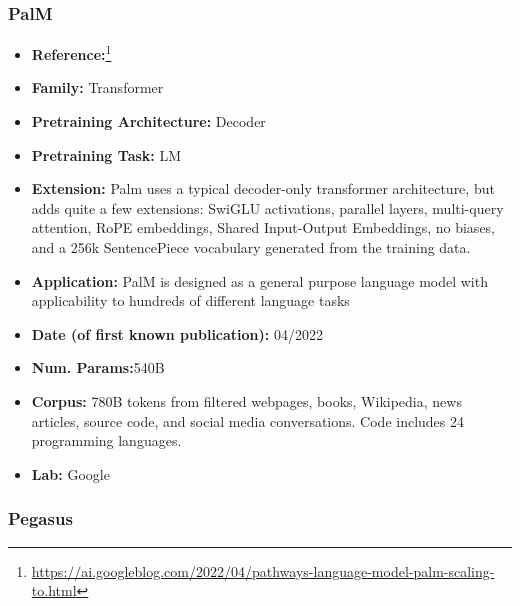 \documentclass{article}
\begin{document}
\subsubsection{PalM}

            \begin{itemize}
                \item \textbf{Reference:}\footnote{\url{https://ai.googleblog.com/2022/04/pathways-language-model-palm-scaling-to.html}}\cite{chowdhery2022palm}
                \item \textbf{Family:} Transformer 
                \item \textbf{Pretraining Architecture:} Decoder
                \item \textbf{Pretraining Task:} LM
                \item \textbf{Extension:} Palm uses a typical decoder-only transformer architecture, but adds quite a few extensions: SwiGLU activations, parallel layers, multi-query attention, RoPE embeddings, Shared Input-Output Embeddings, no biases, and a 256k SentencePiece vocabulary generated from the training data.  
                \item \textbf{Application:} PalM is designed as a general purpose language model with applicability to hundreds of different language tasks
                \item \textbf{Date (of first known publication):} 04/2022
                \item \textbf{Num. Params:}540B
                \item \textbf{Corpus:} 780B tokens from filtered webpages, books, Wikipedia, news articles, source code, and social media conversations. Code includes 24 programming languages.
                \item \textbf{Lab:} Google
            \end{itemize}

\subsubsection{Pegasus}
\end{document}

